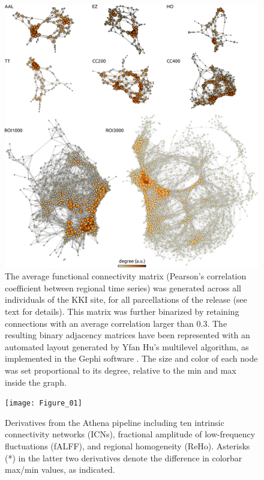 \documentclass[preprint,12pt,3p]{elsarticle}
\begin{document}
\begin{figure}[!t]
\begin{center}
  \includegraphics[width=\linewidth]{fig_connectomes}
  \caption{The average functional connectivity matrix (Pearson's correlation coefficient between regional time series) was generated across all individuals of the KKI site, for all parcellations of the release (see text for details). This matrix was further binarized by retaining connections with an average correlation larger than 0.3. The resulting binary adjacency matrices have been represented with an automated layout generated by Yfan Hu's multilevel algorithm, as implemented in the Gephi software \cite{bastian2009gephi}. The size and color of each node was set proportional to its degree, relative to the min and max inside the graph.}   
  \label{fig:connectomes}
\end{center}
\end{figure}


\begin{figure}[!t]
\begin{center}
  \texttt{[image: Figure\_01]}
  \caption{Derivatives from the Athena pipeline including ten intrinsic connectivity networks (ICNs), fractional amplitude of low-frequency fluctuations (fALFF), and regional homogeneity (ReHo). Asterisks (*) in the latter two derivatives denote the difference in colorbar max/min values, as indicated.}
  \label{fig:derivatives}
\end{center}
\end{figure}
\end{document}
